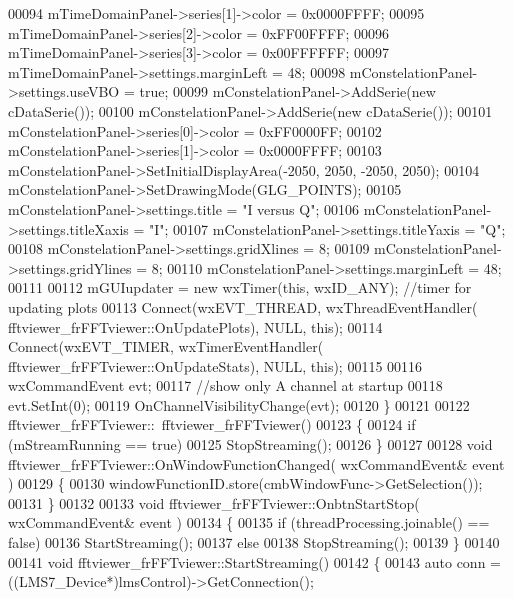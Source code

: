 \begin{DoxyCode}
00094     mTimeDomainPanel->series[1]->color = 0x0000FFFF;
00095     mTimeDomainPanel->series[2]->color = 0xFF00FFFF;
00096     mTimeDomainPanel->series[3]->color = 0x00FFFFFF;
00097     mTimeDomainPanel->settings.marginLeft = 48;
00098     mConstelationPanel->settings.useVBO = \textcolor{keyword}{true};
00099     mConstelationPanel->AddSerie(\textcolor{keyword}{new} cDataSerie());
00100     mConstelationPanel->AddSerie(\textcolor{keyword}{new} cDataSerie());
00101     mConstelationPanel->series[0]->color = 0xFF0000FF;
00102     mConstelationPanel->series[1]->color = 0x0000FFFF;
00103     mConstelationPanel->SetInitialDisplayArea(-2050, 2050, -2050, 2050);
00104     mConstelationPanel->SetDrawingMode(GLG_POINTS);
00105     mConstelationPanel->settings.title = \textcolor{stringliteral}{"I versus Q"};
00106     mConstelationPanel->settings.titleXaxis = \textcolor{stringliteral}{"I"};
00107     mConstelationPanel->settings.titleYaxis = \textcolor{stringliteral}{"Q"};
00108     mConstelationPanel->settings.gridXlines = 8;
00109     mConstelationPanel->settings.gridYlines = 8;
00110     mConstelationPanel->settings.marginLeft = 48;
00111 
00112     mGUIupdater = \textcolor{keyword}{new} wxTimer(\textcolor{keyword}{this}, wxID\_ANY); \textcolor{comment}{//timer for updating plots}
00113     Connect(wxEVT\_THREAD, wxThreadEventHandler(
      fftviewer_frFFTviewer::OnUpdatePlots), NULL, \textcolor{keyword}{this});
00114     Connect(wxEVT\_TIMER, wxTimerEventHandler(
      fftviewer_frFFTviewer::OnUpdateStats), NULL, \textcolor{keyword}{this});
00115 
00116     wxCommandEvent evt;
00117     \textcolor{comment}{//show only A channel at startup}
00118     evt.SetInt(0);
00119     OnChannelVisibilityChange(evt);
00120 \}
00121 
00122 fftviewer_frFFTviewer::~fftviewer_frFFTviewer()
00123 \{
00124     \textcolor{keywordflow}{if} (mStreamRunning == \textcolor{keyword}{true})
00125         StopStreaming();
00126 \}
00127 
00128 \textcolor{keywordtype}{void} fftviewer_frFFTviewer::OnWindowFunctionChanged( wxCommandEvent& event )
00129 \{
00130     windowFunctionID.store(cmbWindowFunc->GetSelection());
00131 \}
00132 
00133 \textcolor{keywordtype}{void} fftviewer_frFFTviewer::OnbtnStartStop( wxCommandEvent& event )
00134 \{
00135     \textcolor{keywordflow}{if} (threadProcessing.joinable() == \textcolor{keyword}{false})
00136         StartStreaming();
00137     \textcolor{keywordflow}{else}
00138         StopStreaming();
00139 \}
00140 
00141 \textcolor{keywordtype}{void} fftviewer_frFFTviewer::StartStreaming()
00142 \{
00143     \textcolor{keyword}{auto} conn = ((LMS7_Device*)lmsControl)->GetConnection();

\end{DoxyCode}
